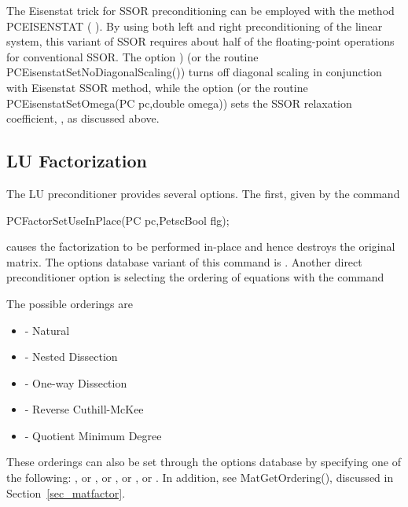 The Eisenstat trick \cite{eisenstat81}  for SSOR preconditioning
can be employed with the method PCEISENSTAT
( ).
By using both left and right preconditioning of the linear system,
this variant of SSOR requires about half of the floating-point operations
for conventional SSOR. The option
)
(or the routine PCEisenstatSetNoDiagonalScaling())
turns off diagonal scaling in conjunction with Eisenstat SSOR method, while
the option  (or the routine
PCEisenstatSetOmega(PC pc,double omega))
sets the SSOR relaxation coefficient, , as discussed above.


\subsection{LU Factorization}
\label{sec_factorization}

The LU preconditioner provides several options.  The first, given by
the 
command  
\begin{tabbing}
  PCFactorSetUseInPlace(PC pc,PetscBool flg);
\end{tabbing}
causes the factorization to be performed in-place and hence
destroys the original matrix.  The options database variant of
this command is . 
Another direct preconditioner option is selecting the ordering
of equations with the command  
\begin{tabbing}
\end{tabbing}
The possible orderings are
\begin{itemize}
\item {} - Natural
\item {} - Nested Dissection
\item {} - One-way Dissection
\item {} - Reverse Cuthill-McKee
\item {} - Quotient Minimum Degree
\end{itemize}
  
  
 
 
These orderings can also be set through the options database by specifying
one of the following:   , or , or  , or , or .
In addition, see MatGetOrdering(), discussed in Section~\ref{sec_matfactor}.

